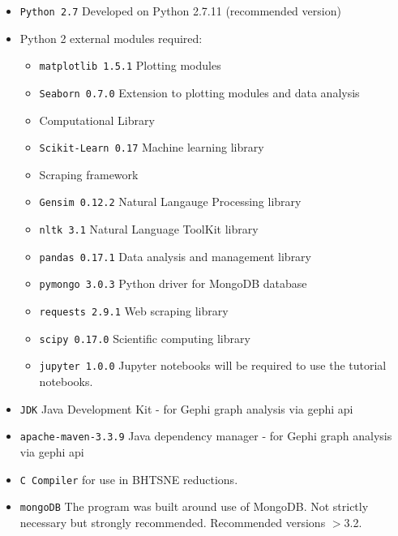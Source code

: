 \begin{itemize}
\item \texttt{Python 2.7} Developed on Python 2.7.11 (recommended version)
\item Python 2 external modules required:
	\begin{itemize}
	\item \texttt{matplotlib 1.5.1} Plotting modules
	\item \texttt{Seaborn 0.7.0} Extension to plotting modules and data analysis \cite{seaborn}
    \item {} Computational Library	
	\item \texttt{Scikit-Learn 0.17} Machine learning library \cite{scikit-learn}
	\item {} Scraping framework
	\item \texttt{Gensim 0.12.2} Natural Langauge Processing library
	\item \texttt{nltk 3.1} Natural Language ToolKit library
	\item \texttt{pandas 0.17.1} Data analysis and management library 
	\item \texttt{pymongo 3.0.3} Python driver for MongoDB database
    \item \texttt{requests 2.9.1} Web scraping library
    \item \texttt{scipy 0.17.0} Scientific computing library
	\item \texttt{jupyter 1.0.0} Jupyter notebooks will be required to use the tutorial notebooks.
    \end{itemize}

\item \texttt{JDK} Java Development Kit - for Gephi graph analysis via gephi api
\item \texttt{apache-maven-3.3.9} Java dependency manager - for Gephi graph analysis via gephi api
\item \texttt{C Compiler} for use in BHTSNE reductions\cite{bhtsne}.
\item \texttt{mongoDB} The program was built around use of MongoDB. Not strictly necessary but strongly recommended. Recommended versions $>$3.2.
\end{itemize}  

